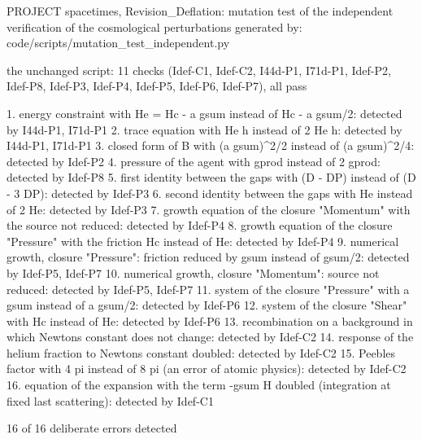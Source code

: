 \documentclass[
  10pt,
]{article}
\newenvironment{Shaded}{}{}
\newcommand{\NormalTok}[1]{#1}
\begin{document}
\begin{Shaded}
\begin{Highlighting}[]
\NormalTok{PROJECT spacetimes, Revision\_Deflation: mutation test of the independent verification of the cosmological perturbations}
\NormalTok{generated by: code/scripts/mutation\_test\_independent.py}

\NormalTok{the unchanged script: 11 checks (Idef{-}C1, Idef{-}C2, I44d{-}P1, I71d{-}P1, Idef{-}P2, Idef{-}P8, Idef{-}P3, Idef{-}P4, Idef{-}P5, Idef{-}P6, Idef{-}P7), all pass}

\NormalTok{ 1. energy constraint with He = Hc {-} a gsum instead of Hc {-} a gsum/2: detected by I44d{-}P1, I71d{-}P1}
\NormalTok{ 2. trace equation with He h\textquotesingle{} instead of 2 He h\textquotesingle{}: detected by I44d{-}P1, I71d{-}P1}
\NormalTok{ 3. closed form of B with (a gsum)\^{}2/2 instead of (a gsum)\^{}2/4: detected by Idef{-}P2}
\NormalTok{ 4. pressure of the agent with gprod instead of 2 gprod: detected by Idef{-}P8}
\NormalTok{ 5. first identity between the gaps with (D {-} DP) instead of (D {-} 3 DP): detected by Idef{-}P3}
\NormalTok{ 6. second identity between the gaps with He instead of 2 He: detected by Idef{-}P3}
\NormalTok{ 7. growth equation of the closure "Momentum" with the source not reduced: detected by Idef{-}P4}
\NormalTok{ 8. growth equation of the closure "Pressure" with the friction Hc instead of He: detected by Idef{-}P4}
\NormalTok{ 9. numerical growth, closure "Pressure": friction reduced by gsum instead of gsum/2: detected by Idef{-}P5, Idef{-}P7}
\NormalTok{10. numerical growth, closure "Momentum": source not reduced: detected by Idef{-}P5, Idef{-}P7}
\NormalTok{11. system of the closure "Pressure" with a gsum instead of a gsum/2: detected by Idef{-}P6}
\NormalTok{12. system of the closure "Shear" with Hc instead of He: detected by Idef{-}P6}
\NormalTok{13. recombination on a background in which Newton\textquotesingle{}s constant does not change: detected by Idef{-}C2}
\NormalTok{14. response of the helium fraction to Newton\textquotesingle{}s constant doubled: detected by Idef{-}C2}
\NormalTok{15. Peebles\textquotesingle{} factor with 4 pi instead of 8 pi (an error of atomic physics): detected by Idef{-}C2}
\NormalTok{16. equation of the expansion with the term {-}gsum H doubled (integration at fixed last scattering): detected by Idef{-}C1}

\NormalTok{16 of 16 deliberate errors detected}
\end{Highlighting}
\end{Shaded}
\end{document}
